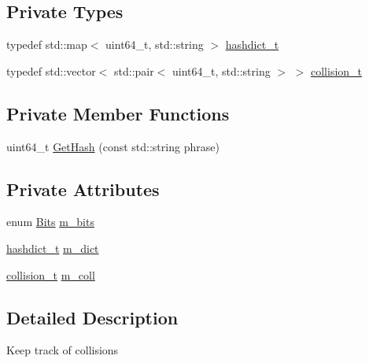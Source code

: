 \subsection*{Private Types}
\begin{DoxyCompactItemize}
\item 
typedef std\+::map$<$ uint64\+\_\+t, std\+::string $>$ \hyperlink{classns3_1_1Hash_1_1Example_1_1Collider_a7851d0a567a058cd09a4d51937234eaa}{hashdict\+\_\+t}
\item 
typedef std\+::vector$<$ std\+::pair$<$ uint64\+\_\+t, std\+::string $>$ $>$ \hyperlink{classns3_1_1Hash_1_1Example_1_1Collider_ab509aacc15884475579257b59acefdea}{collision\+\_\+t}
\end{DoxyCompactItemize}
\subsection*{Private Member Functions}
\begin{DoxyCompactItemize}
\item 
uint64\+\_\+t \hyperlink{classns3_1_1Hash_1_1Example_1_1Collider_a785988b20d366aee65f5f5b35ce5624a}{Get\+Hash} (const std\+::string phrase)
\end{DoxyCompactItemize}
\subsection*{Private Attributes}
\begin{DoxyCompactItemize}
\item 
enum \hyperlink{classns3_1_1Hash_1_1Example_1_1Collider_ab11d49d7dad015a33d1b6c17b3073572}{Bits} \hyperlink{classns3_1_1Hash_1_1Example_1_1Collider_aba2c13c78c36c9bae1b36740d27af746}{m\+\_\+bits}
\item 
\hyperlink{classns3_1_1Hash_1_1Example_1_1Collider_a7851d0a567a058cd09a4d51937234eaa}{hashdict\+\_\+t} \hyperlink{classns3_1_1Hash_1_1Example_1_1Collider_aeb8e300bae7fd86e48749e83cda290ef}{m\+\_\+dict}
\item 
\hyperlink{classns3_1_1Hash_1_1Example_1_1Collider_ab509aacc15884475579257b59acefdea}{collision\+\_\+t} \hyperlink{classns3_1_1Hash_1_1Example_1_1Collider_a7076954f471121480c71827a60e69af9}{m\+\_\+coll}
\end{DoxyCompactItemize}


\subsection{Detailed Description}
Keep track of collisions 

